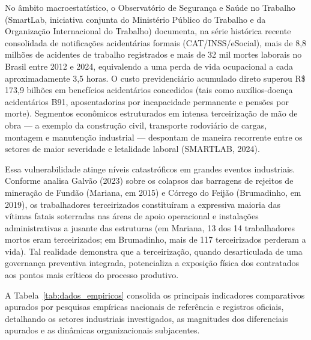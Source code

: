 \documentclass[12pt,a4paper]{article}
\begin{document}
No âmbito macroestatístico, o Observatório de Segurança e Saúde no Trabalho (SmartLab, iniciativa conjunta do Ministério Público do Trabalho e da Organização Internacional do Trabalho) documenta, na série histórica recente consolidada de notificações acidentárias formais (CAT/INSS/eSocial), mais de 8,8 milhões de acidentes de trabalho registrados e mais de 32 mil mortes laborais no Brasil entre 2012 e 2024, equivalendo a uma perda de vida ocupacional a cada aproximadamente 3,5 horas. O custo previdenciário acumulado direto superou R\$ 173,9 bilhões em benefícios acidentários concedidos (tais como auxílios-doença acidentários B91, aposentadorias por incapacidade permanente e pensões por morte). Segmentos econômicos estruturados em intensa terceirização de mão de obra — a exemplo da construção civil, transporte rodoviário de cargas, montagem e manutenção industrial — despontam de maneira recorrente entre os setores de maior severidade e letalidade laboral (SMARTLAB, 2024).

Essa vulnerabilidade atinge níveis catastróficos em grandes eventos industriais. Conforme analisa Galvão (2023) sobre os colapsos das barragens de rejeitos de mineração de Fundão (Mariana, em 2015) e Córrego do Feijão (Brumadinho, em 2019), os trabalhadores terceirizados constituíram a expressiva maioria das vítimas fatais soterradas nas áreas de apoio operacional e instalações administrativas a jusante das estruturas (em Mariana, 13 dos 14 trabalhadores mortos eram terceirizados; em Brumadinho, mais de 117 terceirizados perderam a vida). Tal realidade demonstra que a terceirização, quando desarticulada de uma governança preventiva integrada, potencializa a exposição física dos contratados aos pontos mais críticos do processo produtivo.

A Tabela~\ref{tab:dados_empiricos} consolida os principais indicadores comparativos apurados por pesquisas empíricas nacionais de referência e registros oficiais, detalhando os setores industriais investigados, as magnitudes dos diferenciais apurados e as dinâmicas organizacionais subjacentes.
\end{document}
